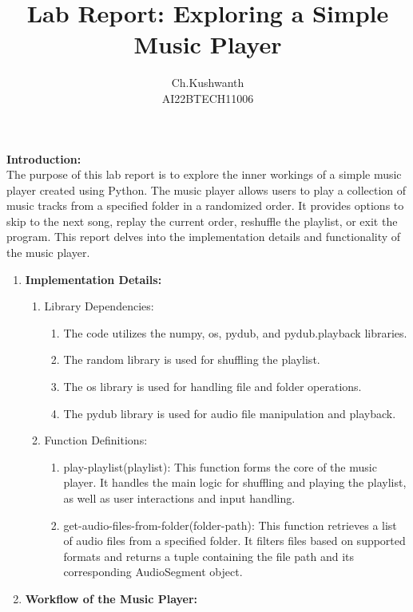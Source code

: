 \documentclass[journal,12pt,onecolumn]{IEEEtran}
\title{\textbf{ Lab Report: Exploring a Simple Music Player}}
\author{Ch.Kushwanth
\\ AI22BTECH11006}
\theoremstyle{remark}
\begin{document}
\maketitle
\Large{\textbf{Introduction:}}\\
The purpose of this lab report is to explore the inner workings of a simple music player created using Python. The music player allows users to play a collection of music tracks from a specified folder in a randomized order. It provides options to skip to the next song, replay the current order, reshuffle the playlist, or exit the program. This report delves into the implementation details and functionality of the music player.
\\
\begin{enumerate}
\item \large{\textbf{Implementation Details:}}\\
\begin{enumerate}
\item Library Dependencies:
\begin{enumerate}
\item The code utilizes the numpy, os, pydub, and pydub.playback libraries.
\item The random library is used for shuffling the playlist.
\item The os library is used for handling file and folder operations.
\item The pydub library is used for audio file manipulation and playback.\\
\end{enumerate}
\item Function Definitions:
\begin{enumerate}
\item play-playlist(playlist): This function forms the core of the music player. It handles the main logic for shuffling and playing the playlist, as well as user interactions and input handling.
\item get-audio-files-from-folder(folder-path): This function retrieves a list of audio files from a specified folder. It filters files based on supported formats and returns a tuple containing the file path and its corresponding AudioSegment object.\\
\end{enumerate}
\end{enumerate}
\item \large{\textbf{Workflow of the Music Player:}}\\
\begin{enumerate}

\end{enumerate}
\end{enumerate}
\end{document}
